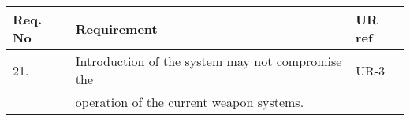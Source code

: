 \begin{center}
    \begin{tabular}{ | l | p{9cm} | l |}
    \hline 
    Req. No & Requirement  & UR ref \\ \hline
    21. & Introduction of the system may not compromise the & UR-3\\ &operation of the current weapon systems. & \\ \hline
    \end{tabular}
\end{center}
